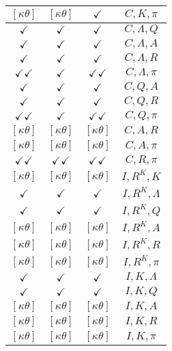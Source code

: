 \documentclass[a4paper,10pt]{article}
\begin{document}
\begin{longtable}{|c|c|c|c|}
\hline
$[\kappa \theta ]$ & $[\kappa \theta ]$ & $\checkmark$ & ${C},{K},{\pi}$ \\
\hline
$\checkmark$ & $\checkmark$ & $\checkmark$ & ${C},{\Lambda},{Q}$ \\
\hline
$\checkmark$ & $\checkmark$ & $\checkmark$ & ${C},{\Lambda},{A}$ \\
\hline
$\checkmark$ & $\checkmark$ & $\checkmark$ & ${C},{\Lambda},{R}$ \\
\hline
$\checkmark\checkmark$ & $\checkmark$ & $\checkmark\checkmark$ & ${C},{\Lambda},{\pi}$ \\
\hline
$\checkmark$ & $\checkmark$ & $\checkmark$ & ${C},{Q},{A}$ \\
\hline
$\checkmark$ & $\checkmark$ & $\checkmark$ & ${C},{Q},{R}$ \\
\hline
$\checkmark\checkmark$ & $\checkmark$ & $\checkmark\checkmark$ & ${C},{Q},{\pi}$ \\
\hline
$[\kappa \theta ]$ & $[\kappa \theta ]$ & $[\kappa \theta ]$ & ${C},{A},{R}$ \\
\hline
$[\kappa \theta ]$ & $[\kappa \theta ]$ & $[\kappa \theta ]$ & ${C},{A},{\pi}$ \\
\hline
$\checkmark\checkmark$ & $\checkmark\checkmark$ & $\checkmark\checkmark$ & ${C},{R},{\pi}$ \\
\hline
$[\kappa \theta ]$ & $[\kappa \theta ]$ & $[\kappa \theta ]$ & ${I},{R^{K}},{K}$ \\
\hline
$\checkmark$ & $\checkmark$ & $\checkmark$ & ${I},{R^{K}},{\Lambda}$ \\
\hline
$\checkmark$ & $\checkmark$ & $\checkmark$ & ${I},{R^{K}},{Q}$ \\
\hline
$[\kappa \theta ]$ & $[\kappa \theta ]$ & $[\kappa \theta ]$ & ${I},{R^{K}},{A}$ \\
\hline
$[\kappa \theta ]$ & $[\kappa \theta ]$ & $[\kappa \theta ]$ & ${I},{R^{K}},{R}$ \\
\hline
$[\kappa \theta ]$ & $[\kappa \theta ]$ & $[\kappa \theta ]$ & ${I},{R^{K}},{\pi}$ \\
\hline
$\checkmark$ & $\checkmark$ & $\checkmark$ & ${I},{K},{\Lambda}$ \\
\hline
$\checkmark$ & $\checkmark$ & $\checkmark$ & ${I},{K},{Q}$ \\
\hline
$[\kappa \theta ]$ & $[\kappa \theta ]$ & $[\kappa \theta ]$ & ${I},{K},{A}$ \\
\hline
$[\kappa \theta ]$ & $[\kappa \theta ]$ & $[\kappa \theta ]$ & ${I},{K},{R}$ \\
\hline
$[\kappa \theta ]$ & $[\kappa \theta ]$ & $[\kappa \theta ]$ & ${I},{K},{\pi}$ \\

\end{longtable}
\end{document}
